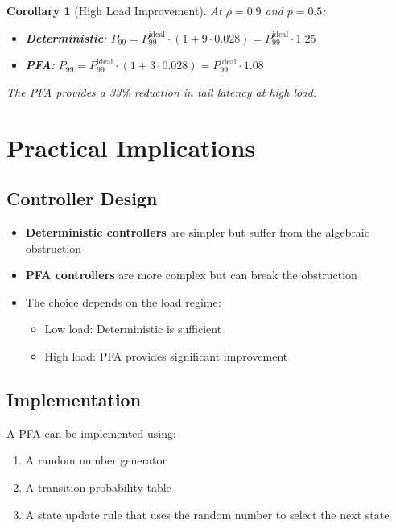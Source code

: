 \documentclass[11pt]{article}
\newtheorem{corollary}[theorem]{Corollary}
\begin{document}
\begin{corollary}[High Load Improvement]
At $\rho = 0.9$ and $p = 0.5$:
\begin{itemize}
    \item \textbf{Deterministic}: $P_{99} = P_{99}^{\text{ideal}} \cdot (1 + 9 \cdot 0.028) = P_{99}^{\text{ideal}} \cdot 1.25$
    \item \textbf{PFA}: $P_{99} = P_{99}^{\text{ideal}} \cdot (1 + 3 \cdot 0.028) = P_{99}^{\text{ideal}} \cdot 1.08$
\end{itemize}

The PFA provides a 33\% reduction in tail latency at high load.
\end{corollary}

\section{Practical Implications}

\subsection{Controller Design}

\begin{itemize}
    \item \textbf{Deterministic controllers} are simpler but suffer from the algebraic obstruction
    \item \textbf{PFA controllers} are more complex but can break the obstruction
    \item The choice depends on the load regime:
    \begin{itemize}
        \item Low load: Deterministic is sufficient
        \item High load: PFA provides significant improvement
    \end{itemize}
\end{itemize}

\subsection{Implementation}

A PFA can be implemented using:
\begin{enumerate}
    \item A random number generator
    \item A transition probability table
    \item A state update rule that uses the random number to select the next state
\end{enumerate}
\end{document}

